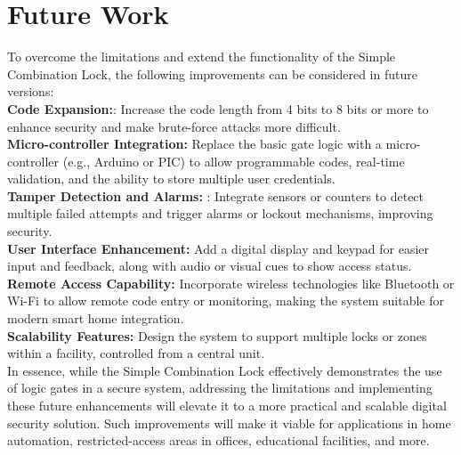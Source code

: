 \section{Future Work}
To overcome the limitations and extend the functionality of the Simple Combination Lock, the following improvements can be considered in future versions: \\
\textbf{Code Expansion:}: Increase the code length from 4 bits to 8 bits or more to enhance security and make brute-force attacks more difficult. \\
\textbf{Micro-controller Integration:} Replace the basic gate logic with a micro-controller (e.g., Arduino or PIC) to allow programmable codes, real-time validation, and the ability to store multiple user credentials.\\ 
\textbf{Tamper Detection and Alarms:} : Integrate sensors or counters to detect multiple failed attempts and trigger alarms or lockout mechanisms, improving security. \\
\textbf{User Interface Enhancement:} Add a digital display and keypad for easier input and feedback, along with audio or visual cues to show access status. \\
\textbf{Remote Access Capability:}  Incorporate wireless technologies like Bluetooth or Wi-Fi to allow remote code entry or monitoring, making the system suitable for modern smart home integration. \\
\textbf{Scalability Features:} Design the system to support multiple locks or zones within a facility, controlled from a central unit. \cite{5.3.1} \\
In essence, while the Simple Combination Lock effectively demonstrates the use of logic gates in a secure system, addressing the limitations and implementing these future enhancements will elevate it to a more practical and scalable digital security solution. Such improvements will make it viable for applications in home automation, restricted-access areas in offices, educational facilities, and more.\cite{5.3.2}
